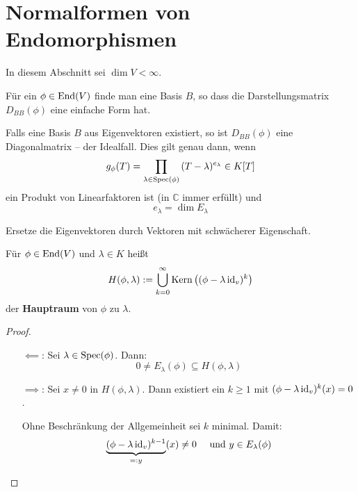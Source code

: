 \documentclass[parskip,a4paper,twoside,DIV15,BCOR12mm]{scrbook}
\begin{document}
\chapter{Normalformen von Endomorphismen}
In diesem Abschnitt sei \(\dim V<\infty\).
\begin{ziel}
Für ein \(\phi\in\operatorname{End}(V)\) finde man eine Basis \(B\), so dass die
Darstellungsmatrix \(D_{BB}(\phi)\) eine einfache Form hat.
\end{ziel}
\begin{remind}
Falls eine Basis \(B\) aus Eigenvektoren existiert, so ist \(D_{BB}(\phi)\) eine
Diagonalmatrix -- der Idealfall. Dies gilt genau dann, wenn
\[
g_{\phi}(T)=\prod_{\lambda\in\operatorname{Spec}(\phi)}{(T-\lambda)^{e_{\lambda}}}\in K[T]
\]
ein Produkt von Linearfaktoren ist (in \(\mathbb{C}\) immer erfüllt) und
\[
e_{\lambda}=\dim E_{\lambda}
\]
\end{remind}
\begin{strategie}
Ersetze die Eigenvektoren durch Vektoren mit schwächerer Eigenschaft.
\end{strategie}
\begin{definition}
Für \(\phi\in\operatorname{End}(V)\) und \(\lambda\in K\) heißt
\[
H(\phi,\lambda):=
    \bigcup_{k=0}^{\infty}{\operatorname{Kern}\left((\phi-\lambda\operatorname{id}_{v})^{k}\right)}
\]
der \textbf{Hauptraum} von \(\phi\) zu \(\lambda\).
\end{definition}
\begin{comment}[1]
\index{Untervektorraum}\index{Untervektorraum!invarianter}
\(H(\phi,\lambda)\) ist ein \(\phi\)-invarianter Untervektorraum von \(V\), denn
es gilt
\[
\Kern\left((\phi-\lambda\id_{v})^{k}\right)\subseteq
    \Kern\left((\phi-\lambda\id_{v})^{k+1}\right)
\]
und
\begin{align*}
(\phi-\lambda\id_{v})^{k}x&=0\\
(\phi-\lambda\id_{v})^{k}\phi(x)&=0
\end{align*}
\end{comment}
\begin{comment}[2]
\[
H(\phi,\lambda)\neq {0}\Longleftrightarrow\lambda\in\Spec(\phi)
\]
\end{comment}
\begin{proof}
\begin{itemize}
\item[\(\impliedby\):] Sei \(\lambda\in\operatorname{Spec}(\phi)\). Dann:
\[
0\neq E_{\lambda}(\phi)\subseteq H(\phi,\lambda)
\]
\item[\(\implies\):] Sei \(x\neq0\) in \(H(\phi,\lambda)\). Dann existiert
ein \(k\geq1\) mit \((\phi-\lambda\operatorname{id}_{v})^{k}(x)=0\).

Ohne Beschränkung der Allgemeinheit sei \(k\) minimal. Damit:
\[
\underbrace{(\phi-\lambda\operatorname{id}_{v})^{k-1}}_{=:y}(x)\neq0
    \quad\text{ und }y\in E_{\lambda}(\phi)
\]
\end{itemize}
\end{proof}
\end{document}
